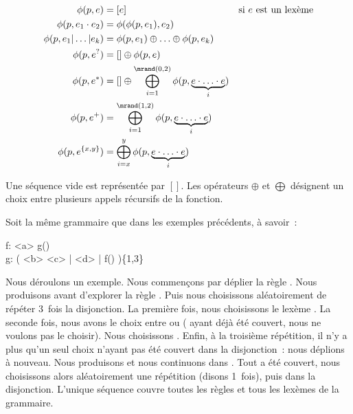 \begin{align*}
%
\phi(p, e) & =
    [e]
    &
    \text{si $e$ est un lexème}
    \\
%
\phi(p, e_1 \cdot e_2) & =
    \phi(\phi(p, e_1), e_2)
    \\
%
\phi(p, e_1 \vert \dotso \vert e_k) & =
    \phi(p, e_1) \oplus \dotso \oplus \phi(p, e_k)
    \\
%
\phi(p, e^?) & =
    [] \oplus \phi(p, e)
    \\
%
\phi(p, e^*) & =
    [] \oplus \bigoplus_{i = 1}^{\mrand(0, 2)}
    \phi(p, \underbrace{e \cdot \dotso \cdot e}_i)
    \\
%
\phi(p, e^+) & =
    \bigoplus_{i = 1}^{\mrand(1, 2)}
    \phi(p, \underbrace{e \cdot \dotso \cdot e}_i)
    \\
%
\phi(p, e^{\{x, y\}}) & =
    \bigoplus_{i = x}^y \phi(p, \underbrace{e \cdot \dotso \cdot e}_i)
%
\end{align*}

Une séquence vide est représentée par $[]$. Les opérateurs $\oplus$ et
$\bigoplus$ désignent un choix entre plusieurs appels récursifs de la fonction.

\begin{example}
\label{example:data:coverage_based_generation}

Soit la même grammaire que dans les exemples précédents, à savoir~:

\begin{pre}
f: <a> g() \\
g: ( <b> <c> | <d> | f() )\{1,3\}
\end{pre}

Nous déroulons un exemple. Nous commençons par déplier la règle . Nous
produisons  avant d'explorer la règle . Puis nous choisissons
aléatoirement de répéter 3~fois la disjonction. La première fois, nous
choisissons le lexème . La seconde fois, nous avons le choix entre
 ou  ( ayant déjà été couvert, nous ne voulons
pas le choisir). Nous choisissons . Enfin, à la troisième
répétition, il n'y a plus qu'un seul choix n'ayant pas été couvert dans la
disjonction~: nous déplions  à nouveau. Nous produisons  et
nous continuons dans . Tout a été couvert, nous choisissons alors
aléatoirement une répétition (disons 1~fois), puis  dans la
disjonction. L'unique séquence  couvre toutes les
règles et tous les lexèmes de la grammaire.

\end{example}

